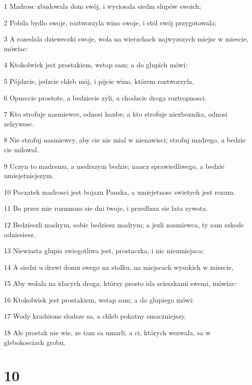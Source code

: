 \par 1 Madrosc zbudowala dom swój, i wyciosala siedm slupów swoich;
\par 2 Pobila bydlo swoje, roztworzyla wino swoje, i stól swój przygotowala;
\par 3 A rozeslala dzieweczki swoje, wola na wierzchach najwyzszych miejsc w miescie, mówiac:
\par 4 Ktokolwiek jest prostakiem, wstap sam; a do glupich mówi:
\par 5 Pójdzcie, jedzcie chleb mój, i pijcie wino, którem roztworzyla.
\par 6 Opusccie prostote, a bedziecie zyli, a chodzcie droga roztropnosci.
\par 7 Kto strofuje nasmiewce, odnosi hanbe; a kto strofuje niezboznika, odnosi zelzywosc.
\par 8 Nie strofuj nasmiewcy, aby cie nie mial w nienawisci; strofuj madrego, a bedzie cie milowal.
\par 9 Uczyn to madremu, a medrszym bedzie; naucz sprawiedliwego, a bedzie umiejetniejszym.
\par 10 Poczatek madrosci jest bojazn Panska, a umiejetnosc swietych jest rozum.
\par 11 Bo przez mie rozmnoza sie dni twoje, i przedluza sie lata zywota.
\par 12 Bedzieszli madrym, sobie bedziesz madrym; a jezli nasmiewca, ty sam szkode odniesiesz.
\par 13 Niewiasta glupia swiegotliwa jest, prostaczka, i nic nieumiejaca;
\par 14 A siedzi u drzwi domu swego na stolku, na miejscach wysokich w miescie,
\par 15 Aby wolala na idacych droga, którzy prosto ida scieszkami swemi, mówiac:
\par 16 Ktokolwiek jest prostakiem, wstap sam; a do glupiego mówi:
\par 17 Wody kradzione slodsze sa, a chleb pokatny smaczniejszy.
\par 18 Ale prostak nie wie, ze tam sa umarli, a ci, których wezwala, sa w glebokosciach grobu.

\chapter{10}

